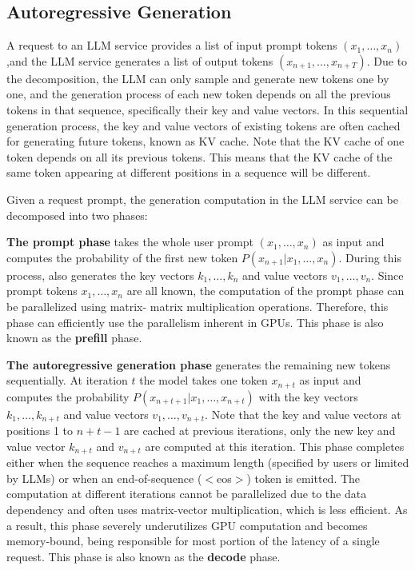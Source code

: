 \subsection{Autoregressive Generation}
A request to an LLM service provides a list of input prompt tokens $(x_1, \dots,x_n)$,and the LLM service generates a list of output tokens $(x_{n + 1}, \dots,x_{n + T})$. Due to the decomposition, the LLM can only sample and generate new tokens one by one, and the generation process of each new token depends on all the previous tokens in that sequence, specifically their key and value vectors. In this sequential generation process, the key and value vectors of existing tokens are often cached for generating future tokens, known as KV cache. Note that the KV cache of one token depends on all its previous tokens. This means that the KV cache of the same token appearing at different positions in a sequence will be different. 

Given a request prompt, the generation computation in the LLM service can be decomposed into two phases:

\textbf{The prompt phase} takes the whole user prompt $(x_1, \dots,x_n)$
as input and computes the probability of the first new token $P(x_{n + 1} | x_1,\dots,x_n)$. During this process, also generates the key vectors $k_1,\dots ,k_n$ and value vectors $v_1,\dots ,v_n$. Since prompt tokens $x_1, \dots,x_n$ are all known, the computation of the prompt phase can be parallelized using matrix-
matrix multiplication operations. Therefore, this phase can efficiently use the parallelism inherent in GPUs. This phase is also known as the \textbf{prefill} phase.

\textbf{The autoregressive generation phase} generates the remaining new tokens sequentially. At iteration $t$ the model takes one token $x_{n+t}$ as input and computes the probability $P(x_{n + t + 1} | x_1,\dots,x_{n + t})$ with the key vectors $k_1,\dots ,k_{n + t}$ and value vectors $v_1,\dots ,v_{n + t}$. Note that the key and value vectors at positions 1 to $n + t - 1$ are cached at previous iterations, only the new key and value vector $k_{n + t}$ and $v_{n + t}$ are computed at this iteration. This phase completes either when the sequence reaches a maximum length (specified by users or limited by LLMs) or when an end-of-sequence ($<$eos$>$) token is emitted. The computation at different iterations cannot be parallelized due to the data dependency and often uses matrix-vector multiplication, which is less efficient. As a result, this phase severely underutilizes GPU computation and becomes memory-bound, being responsible for most portion of the latency of a single request. This phase is also known as the \textbf{decode} phase.

